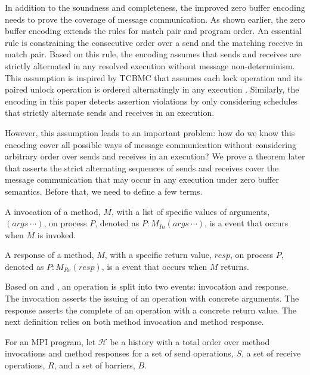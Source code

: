 In addition to the soundness and completeness, the improved zero buffer encoding needs to prove the coverage of message communication. As shown earlier, the zero buffer encoding extends the rules for match pair and program order. An essential rule is constraining the consecutive order over a send and the matching receive in match pair. Based on this rule, the encoding assumes that sends and receives are strictly alternated in any resolved execution without message non-determinism. This assumption is inspired by TCBMC that assumes each lock operation and its paired unlock operation is ordered alternatingly in any execution \cite{DBLP:conf/cav/RabinovitzG05}. Similarly, the encoding in this paper detects assertion violations by only considering schedules that strictly alternate sends and receives in an execution. 

However, this assumption leads to an important problem: how do we know this encoding cover all possible ways of message communication without considering arbitrary order over sends and receives in an execution? We prove a theorem later that asserts the strict alternating sequences of sends and receives cover the message communication that may occur in any execution under zero buffer semantics. Before that, we need to define a few terms.

\begin{definition}\label{def:invocation}
A invocation of a method, $M$, with a list of specific values of arguments, $(args\ \cdots)$, on process $P$, denoted as $P:M_\mathit{In}(args\ \cdots)$, is a event that occurs when $M$ is invoked. 
\end{definition}

\begin{definition}\label{def:response}
A response of a method, $M$, with a specific return value, $resp$, on process $P$, denoted as $P:M_\mathit{Re}(resp)$, is a event that occurs when $M$ returns. 
\end{definition}

Based on  and , an operation is split into two events: invocation and response. The invocation asserts the issuing of an operation with concrete arguments. The response asserts the complete of an operation with a concrete return value. The next definition relies on both method invocation and method response. 

\begin{definition}[History]\label{def:history}
For an MPI program, let $\mathcal{H}$ be a history with a total order over method invocations and method responses for a set of send operations, $S$, a set of receive operations, $R$, and a set of barriers, $B$.
\end{definition}

